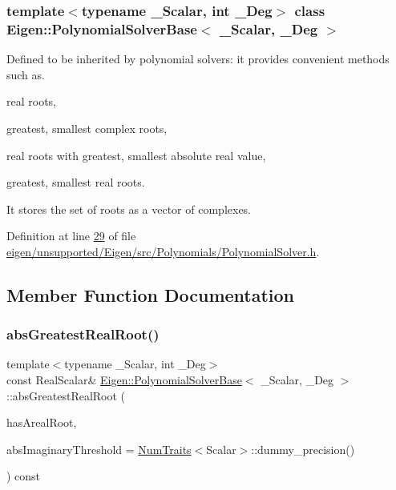 \subsubsection*{template$<$typename \+\_\+\+Scalar, int \+\_\+\+Deg$>$\newline
class Eigen\+::\+Polynomial\+Solver\+Base$<$ \+\_\+\+Scalar, \+\_\+\+Deg $>$}

Defined to be inherited by polynomial solvers\+: it provides convenient methods such as. 


\begin{DoxyItemize}
\item real roots,
\item greatest, smallest complex roots,
\item real roots with greatest, smallest absolute real value,
\item greatest, smallest real roots.
\end{DoxyItemize}

It stores the set of roots as a vector of complexes. 

Definition at line \hyperlink{eigen_2unsupported_2_eigen_2src_2_polynomials_2_polynomial_solver_8h_source_l00029}{29} of file \hyperlink{eigen_2unsupported_2_eigen_2src_2_polynomials_2_polynomial_solver_8h_source}{eigen/unsupported/\+Eigen/src/\+Polynomials/\+Polynomial\+Solver.\+h}.



\subsection{Member Function Documentation}
\mbox{\label{class_eigen_1_1_polynomial_solver_base_aa2f003d9662af8c776f1a1c12a9d4210}} 
\subsubsection{\texorpdfstring{abs\+Greatest\+Real\+Root()}{absGreatestRealRoot()}\hspace{0.1cm}{\footnotesize\ttfamily [1/2]}}
{\footnotesize\ttfamily template$<$typename \+\_\+\+Scalar, int \+\_\+\+Deg$>$ \\
const Real\+Scalar\& \hyperlink{class_eigen_1_1_polynomial_solver_base}{Eigen\+::\+Polynomial\+Solver\+Base}$<$ \+\_\+\+Scalar, \+\_\+\+Deg $>$\+::abs\+Greatest\+Real\+Root (\begin{DoxyParamCaption}\item[{bool \&}]{has\+Areal\+Root,  }\item[{const Real\+Scalar \&}]{abs\+Imaginary\+Threshold = {\ttfamily \hyperlink{group___core___module_struct_eigen_1_1_num_traits}{Num\+Traits}$<$Scalar$>$\+:\+:dummy\+\_\+precision()} }\end{DoxyParamCaption}) const\hspace{0.3cm}{\ttfamily [inline]}}

